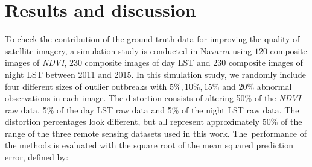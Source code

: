 \section{Results and discussion}
\label{Chap6_sec:results}
To check the contribution of the ground-truth data for improving the quality of satellite imagery, a simulation
study is conducted in Navarra using $120$ composite images of \emph{NDVI}, $230$ composite images of day LST and $230$ composite images of night LST between 2011 and 2015. In this simulation study, we randomly include four different sizes of outlier outbreaks with $5\%, 10\%, 15\%$ and $20\%$ abnormal observations in each image. %
The distortion consists of altering 50\% of the \emph{NDVI} raw data, 5\% of the day LST raw data and 5\% of the night LST raw data. The distortion percentages look different, but all represent approximately 50\% of the range of the three remote sensing datasets used in this work.
The~performance of the methods is evaluated with the square root of the mean squared prediction error, defined by:

